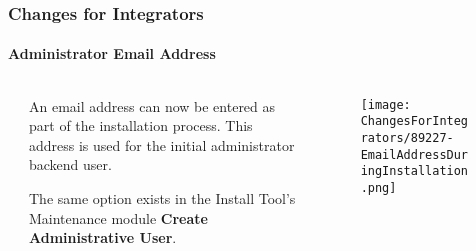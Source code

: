 \begin{frame}[fragile]
	\frametitle{Changes for Integrators}
	\framesubtitle{Administrator Email Address}

	\begin{columns}[T]
		\begin{column}{.04\textwidth}
		\end{column}
		\begin{column}{.38\textwidth}

			An email address can now be entered as part of the installation process.
			This address is used for the initial administrator backend user.

			\vspace{0.2cm}

			The same option exists in the Install Tool's Maintenance module
			\textbf{Create Administrative User}.

		\end{column}
		\begin{column}{.58\textwidth}
			\vspace{-0.3cm}
			\begin{figure}
				\texttt{[image: ChangesForIntegrators/89227-EmailAddressDuringInstallation.png]}
			\end{figure}
		\end{column}
	\end{columns}

\end{frame}



